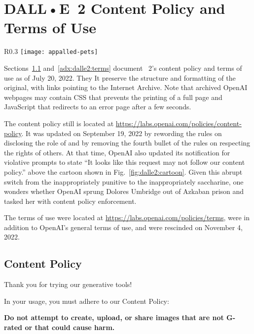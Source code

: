 
\newpage
\section{DALL•E~2 Content Policy and Terms of Use}
\label{adx:dalle2:policies}

\begin{wrapfigure}[9]{R}{0.3\textwidth}
\centering
\texttt{[image: appalled-pets]}
\caption{Be nice to \DALLE's pets!}\label{fig:dalle2:cartoon}
\end{wrapfigure}

Sections~\ref{adx:dalle2:contentpolicy} and~\ref{adx:dalle2:terms} document
\DALLE~2's content policy and terms of use as of July 20, 2022. They It preserve
the structure and formatting of the original, with links pointing to the
Internet Archive. Note that archived OpenAI webpages may contain CSS that
prevents the printing of a full page and JavaScript that redirects to an error
page after a few seconds.

The content policy still is located at
\url{https://labs.openai.com/policies/content-policy}. It was updated on
September 19, 2022 by rewording the rules on disclosing the role of \AI{} and by
removing the fourth bullet of the rules on respecting the rights of others. At
that time, OpenAI also updated its notification for violative prompts to state
``It looks like this request may not follow our content policy.'' above the
cartoon shown in Fig.~\ref{fig:dalle2:cartoon}. Given this abrupt switch from
the inappropriately punitive to the inappropriately saccharine, one wonders
whether OpenAI sprung Dolores Umbridge out of Azkaban prison and tasked her with
content policy enforcement.

The terms of use were located at
\url{https://labs.openai.com/policies/terms}, were in addition to OpenAI's
general terms of use, and were rescinded on November 4, 2022.


\subsection{Content Policy}
\label{adx:dalle2:contentpolicy}

Thank you for trying our generative \AI{} tools!

\noindent In your usage, you must adhere to our Content Policy:

\vspace{.5em}\noindent\textbf{Do not attempt to create, upload, or share images
    that are not G-rated or that could cause harm.}

